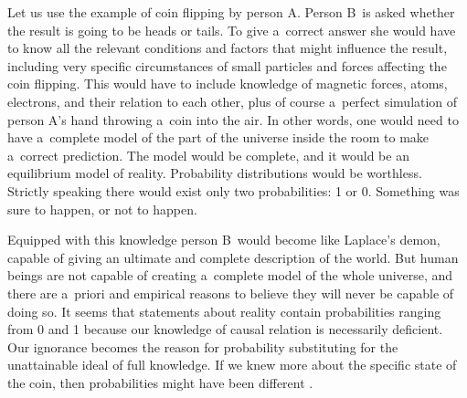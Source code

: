 Let us use the example of coin flipping by person A. Person B~is asked whether the result is going to be heads or tails. To give a~correct answer she would have to know all the relevant conditions and factors that might influence the result, including very specific circumstances of small particles and forces affecting the coin flipping. This would have to include knowledge of magnetic forces, atoms, electrons, and their relation to each other, plus of course a~perfect simulation of person A's hand throwing a~coin into the air. In other words, one would need to have a~complete model of the part of the universe inside the room to make a~correct prediction. The model would be complete, and it would be an equilibrium model of reality. Probability distributions would be worthless. Strictly speaking there would exist only two probabilities: 1 or 0. Something was sure to happen, or not to happen.



Equipped with this knowledge person B~would become like Laplace's demon, capable of giving an ultimate and complete description of the world. But human beings are not capable of creating a~complete model of the whole universe, and there are a~priori and empirical reasons to believe they will never be capable of doing so. It seems that statements about reality contain probabilities ranging from 0 and 1 because our knowledge of causal relation is necessarily deficient. Our ignorance becomes the reason for probability substituting for the unattainable ideal of full knowledge. If we knew more about the specific state of the coin, then probabilities might have been different 
\parencite[][pp.179–180]{reeves_theory_1988}.%




